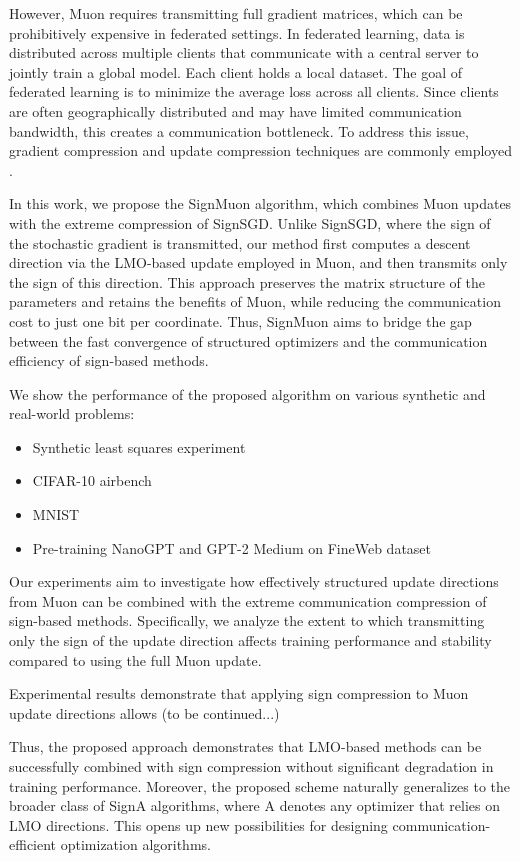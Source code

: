 \documentclass{article}
\begin{document}
However, Muon requires transmitting full gradient matrices, which can be prohibitively expensive in federated settings. In federated learning, data is distributed across multiple clients that communicate with a central server to jointly train a global model. Each client holds a local dataset. The goal of federated learning is to minimize the average loss across all clients. Since clients are often geographically distributed and may have limited communication bandwidth, this creates a communication bottleneck. To address this issue, gradient compression and update compression techniques are commonly employed \cite{bernstein2018signsgd, horvath2023quantization}. 

In this work, we propose the SignMuon algorithm, which combines Muon updates with the extreme compression of SignSGD. Unlike SignSGD, where the sign of the stochastic gradient is transmitted, our method first computes a descent direction via the LMO-based update employed in Muon, and then transmits only the sign of this direction. This approach preserves the matrix structure of the parameters and retains the benefits of Muon, while reducing the communication cost to just one bit per coordinate. Thus, SignMuon aims to bridge the gap between the fast convergence of structured optimizers and the communication efficiency of sign-based methods.

We show the performance of the proposed algorithm on various synthetic and real-world problems:
\begin{itemize}
    \item Synthetic least squares experiment
    \item CIFAR-10 airbench \cite{jordan2023airbench}
    \item MNIST
    \item Pre-training NanoGPT and GPT-2 Medium on FineWeb dataset \cite{jordan2024modded}
\end{itemize}

Our experiments aim to investigate how effectively structured update directions from Muon can be combined with the extreme communication compression of sign-based methods. Specifically, we analyze the extent to which transmitting only the sign of the update direction affects training performance and stability compared to using the full Muon update.

Experimental results demonstrate that applying sign compression to Muon update directions allows (to be continued...) 

Thus, the proposed approach demonstrates that LMO-based methods can be successfully combined with sign compression without significant degradation in training performance. Moreover, the proposed scheme naturally generalizes to the broader class of SignA algorithms, where A denotes any optimizer that relies on LMO directions. This opens up new possibilities for designing communication-efficient optimization algorithms.
\end{document}
